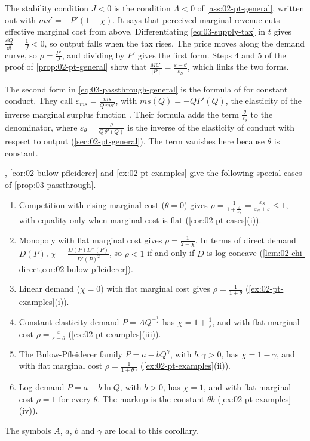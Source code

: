 The stability condition $J < 0$ is the condition $\Lambda < 0$ of \cref{ass:02-pt-general}, written out with
$ms' = -P'(1 - \chi)$. It says that perceived marginal revenue cuts effective marginal cost from above. Differentiating
\eqref{eq:03-supply-tax} in $t$ gives $\frac{\dd Q}{\dd t} = \frac{1}{J} < 0$, so output falls when the tax rises. The
price moves along the demand curve, so $\rho = \frac{P'}{J}$, and dividing by $P'$ gives the first form. Steps 4 and 5 of
the proof of \cref{prop:02-pt-general} show that $\frac{MC'}{\lvert P'\rvert} = \frac{\varepsilon - \theta}{\varepsilon_S}$,
which links the two forms.

The second form in \eqref{eq:03-passthrough-general} is the formula of \citet[eq.~(2), p.~548]{WeylFabinger2013} for
constant conduct. They call $\varepsilon_{ms} = \frac{ms}{Q\, ms'}$, with $ms(Q) = -QP'(Q)$, the elasticity of the
inverse marginal surplus function \citep[p.~539]{WeylFabinger2013}. Their formula adds the term
$\frac{\theta}{\varepsilon_\theta}$ to the denominator, where $\varepsilon_\theta = \frac{\theta}{Q\,\theta'(Q)}$ is the
inverse of the elasticity of conduct with respect to output (\cref{sec:02-pt-general}). The term vanishes here because $\theta$ is
constant.

\begin{corollary}\label{cor:03-passthrough-cases}
, \cref{cor:02-bulow-pfleiderer} and \cref{ex:02-pt-examples} give the following special cases
of \cref{prop:03-passthrough}.
\begin{enumerate}[label=(\roman*)]
\item Competition with rising marginal cost ($\theta = 0$) gives
  $\rho = \frac{1}{1 + \frac{\varepsilon}{\varepsilon_S}} = \frac{\varepsilon_S}{\varepsilon_S + \varepsilon} \le 1$,
  with equality only when marginal cost is flat (\cref{cor:02-pt-cases}(i)).
\item Monopoly with flat marginal cost gives $\rho = \frac{1}{2 - \chi}$. In terms of direct demand $D(P)$,
  $\chi = \frac{D(P) D''(P)}{D'(P)^2}$, so $\rho < 1$ if and only if $D$ is log-concave
  (\cref{lem:02-chi-direct,cor:02-bulow-pfleiderer}).
\item Linear demand ($\chi = 0$) with flat marginal cost gives $\rho = \frac{1}{1 + \theta}$
  (\cref{ex:02-pt-examples}(i)).
\item Constant-elasticity demand $P = A Q^{-\frac{1}{\varepsilon}}$ has $\chi = 1 + \frac{1}{\varepsilon}$, and with
  flat marginal cost $\rho = \frac{\varepsilon}{\varepsilon - \theta}$ (\cref{ex:02-pt-examples}(iii)).
\item The Bulow-Pfleiderer family $P = a - bQ^{\gamma}$, with $b, \gamma > 0$, has $\chi = 1 - \gamma$, and with flat
  marginal cost $\rho = \frac{1}{1 + \theta\gamma}$ (\cref{ex:02-pt-examples}(ii)).
\item Log demand $P = a - b\ln Q$, with $b > 0$, has $\chi = 1$, and with flat marginal cost $\rho = 1$ for every
  $\theta$. The markup is the constant $\theta b$ (\cref{ex:02-pt-examples}(iv)).
\end{enumerate}
The symbols $A$, $a$, $b$ and $\gamma$ are local to this corollary.
\end{corollary}

